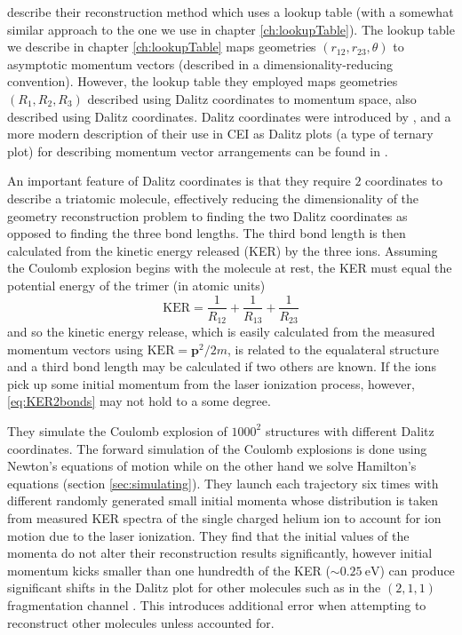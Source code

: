 \citet[supplementary material]{Kunitski15} describe their reconstruction method which uses a lookup table (with a somewhat similar approach to the one we use in chapter \ref{ch:lookupTable}). The lookup table we describe in chapter \ref{ch:lookupTable} maps geometries $(r_{12}, r_{23}, \theta)$ to asymptotic momentum vectors (described in a dimensionality-reducing convention). However, the lookup table they employed maps geometries $(R_1, R_2, R_3)$ described using Dalitz coordinates to momentum space, also described using Dalitz coordinates. Dalitz coordinates were introduced by \citet{Dalitz53}, and a more modern description of their use in CEI as Dalitz plots (a type of ternary plot) for describing momentum vector arrangements can be found in \citet{Ramadhan16}.

An important feature of Dalitz coordinates is that they require $2$ coordinates to describe a triatomic molecule, effectively reducing the dimensionality of the geometry reconstruction problem to finding the two Dalitz coordinates as opposed to finding the three bond lengths. The third bond length is then calculated from the kinetic energy released (KER) by the three ions. Assuming the Coulomb explosion begins with the molecule at rest, the KER must equal the potential energy of the trimer (in atomic units)
\begin{equation} \label{eq:KER2bonds}
\mathrm{KER} = \frac{1}{R_{12}} + \frac{1}{R_{13}} + \frac{1}{R_{23}}
\end{equation}
and so the kinetic energy release, which is easily calculated from the measured momentum vectors using $\mathrm{KER} = \mathbf{p}^2/2m$, is related to the equalateral structure and a third bond length may be calculated if two others are known. If the ions pick up some initial momentum from the laser ionization process, however, \eqref{eq:KER2bonds} may not hold to a some degree.

They simulate the Coulomb explosion of $1000^2$ structures with different Dalitz coordinates. The forward simulation of the Coulomb explosions is done using Newton's equations of motion while on the other hand we solve Hamilton's equations (section \ref{sec:simulating}). They launch each trajectory six times with different randomly generated small initial momenta whose distribution is taken from measured KER spectra of the single charged helium ion to account for ion motion due to the laser ionization. They find that the initial values of the momenta do not alter their reconstruction results significantly, however initial momentum kicks smaller than one hundredth of the KER ($\sim\SI{0.25}{\eV}$) can produce significant shifts in the Dalitz plot for other molecules such as  in the $(2,1,1)$ fragmentation channel \citep{Ramadhan16}. This introduces additional error when attempting to reconstruct other molecules unless accounted for.

